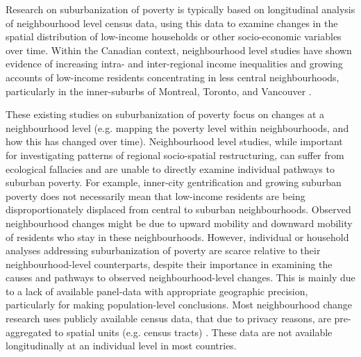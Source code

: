 Research on suburbanization of poverty is typically based on longitudinal analysis of neighbourhood level census data, using this data to examine changes in the spatial distribution of low-income households or other socio-economic variables over time. Within the Canadian context, neighbourhood level studies have shown evidence of increasing intra- and inter-regional income inequalities \cite{bolton_growing_2012,chen_why_2012,walks_income_2013} and growing accounts of low-income residents concentrating in less central neighbourhoods, particularly in the inner-suburbs of Montreal, Toronto, and Vancouver \cite{ades_are_2012,pavlic_declining_2014,ades_is_2016,breau_pulling_2018, grant_changing_2020}. 

These existing studies on suburbanization of poverty focus on changes at a neighbourhood level (e.g. mapping the poverty level within neighbourhoods, and how this has changed over time). Neighbourhood level studies, while important for investigating patterns of regional socio-spatial restructuring, can suffer from ecological fallacies and are unable to directly examine individual pathways to suburban poverty. For example, inner-city gentrification and growing suburban poverty does not necessarily mean that low-income residents are being disproportionately displaced from central to suburban neighbourhoods. Observed neighbourhood changes might be due to upward mobility and downward mobility of residents who stay in these neighbourhoods. However, individual or household analyses addressing suburbanization of poverty are scarce relative to their neighbourhood-level counterparts, despite their importance in examining the causes and pathways to observed neighbourhood-level changes. This is mainly due to a lack of available panel-data with appropriate geographic precision, particularly for making population-level conclusions. Most neighbourhood change research uses publicly available census data, that due to privacy reasons, are pre-aggregated to spatial units (e.g. census tracts) \cite{logan_interpolating_2014,allen_new_2018}. These data are not available longitudinally at an individual level in most countries. 

